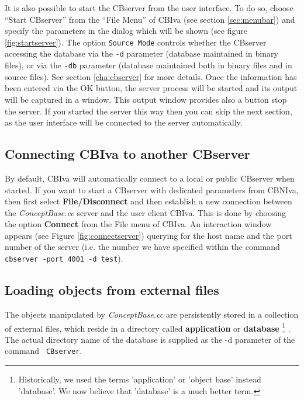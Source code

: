 It is also possible to start the CBserver from the user interface.
To do so, choose ``Start CBserver'' from the ``File Menu'' of CBIva (see
section \ref{sec:menubar}) and specify the parameters in the dialog which
will be shown (see figure \ref{fig:startserver}).
The option {\tt Source Mode}  controls whether the CBserver accessing
the database via the {\tt -d} parameter (database maintained in binary files),
or via the {\tt -db} parameter (database maintained both in binary files and
in source files). See section \ref{cha:cbserver} for more details.
Once the information has been
entered via the OK button, the server process will be started and its output will be captured
in a window. This output window provides also a button stop the server.
If you started the server this way then you can skip the next section,
as the user interface will be connected to the server automatically.




\subsection{Connecting CBIva to another CBserver}

By default, CBIva will automatically connect to a local or public CBserver when started.
If you want to start a CBserver with dedicated parameters from CBNIva, then first 
select {\bf File/Disconnect} and then
establish a new connection between the {\em ConceptBase.cc}  server and the user
client CBIva. This is done by choosing the option {\bf Connect}
from the File menu of CBIva. An interaction window
appears (see Figure \ref{fig:connectserver}) querying for the host name
and the port number of the server (i.e. the number we have specified within
the command {\tt cbserver -port 4001 -d test}).


\subsection{Loading objects from external files}

The objects manipulated by {\em ConceptBase.cc} are persistently stored in a
collection of external files, which reside in a directory called {\bf
application} or {\bf database}%
\footnote{Historically, we used the terms 'application' or 'object base' instead 'database'.
We now believe that 'database' is a much better term.}%
. The actual directory name of the
database is supplied as the -d parameter of the command {\tt
CBserver}.

